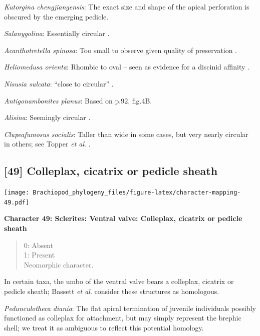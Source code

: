 \documentclass[]{book}
\theoremstyle{definition}
\theoremstyle{definition}
\theoremstyle{definition}
\theoremstyle{remark}
\begin{document}
\emph{Kutorgina chengjiangensis}: The exact size and shape of the apical
perforation is obscured by the emerging pedicle.

\emph{Salanygolina}: Essentially circular \citep[fig.
4]{Holmer2009Theenigmatic}.

\emph{Acanthotretella spinosa}: Too small to observe given quality of
preservation \citep{Holmer2006Aspinose}.

\emph{Heliomedusa orienta}: Rhombic to oval -- seen as evidence for a
discinid affinity \citep{Chen2007Reinterpretationof}.

\emph{Nisusia sulcata}: ``close to circular''
\citep{Holmer2018Evolutionarysignificance}.

\emph{Antigonambonites planus}: Based on p.92, fig.4B.

\emph{Alisina}: Seemingly circular \citep{Zhang2011Anobolellate}.

\emph{Clupeafumosus socialis}: Taller than wide in some cases, but very
nearly circular in others; see Topper \emph{et al}.
\citeyearpar{Topper2013Reappraisalof}.

\hypertarget{colleplax-cicatrix-or-pedicle-sheath}{%
\subsection*{{[}49{]} Colleplax, cicatrix or pedicle
sheath}\label{colleplax-cicatrix-or-pedicle-sheath}}

\texttt{[image: Brachiopod\_phylogeny\_files/figure-latex/character-mapping-49.pdf]}

\textbf{Character 49: Sclerites: Ventral valve: Colleplax, cicatrix or
pedicle sheath}

\begin{quote}
0: Absent\\
1: Present\\
Neomorphic character.
\end{quote}

In certain taxa, the umbo of the ventral valve bears a colleplax,
cicatrix or pedicle sheath; Bassett \emph{et al}.
\citeyearpar{Bassett2008Earlyontogeny} consider these structures as
homologous.

\emph{Pedunculotheca diania}: The flat apical termination of juvenile
individuals possibly functioned as colleplax for attachment, but may
simply represent the brephic shell; we treat it as ambiguous to reflect
this potential homology.
\end{document}
